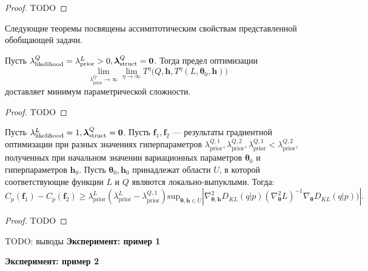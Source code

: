 \begin{proof}
TODO
\end{proof}


Следующие теоремы посвящены ассимптотическим свойствам представленной обобщающей задачи.
\begin{theorem}
Пусть ${\lambda_{\text{likelihood}}^Q}= {\lambda_{\text{prior}}^L}>0, {\boldsymbol{\lambda}^Q_{\text{struct}} }= \bf{0}$.
Тогда предел оптимизации
\[
\lim_{{\lambda^Q_\text{prior}} \to \infty} \lim_{\eta \to \infty}   T^\eta\bigl(Q, \mathbf{h}, T^\eta(L, \boldsymbol{\theta}_0, \mathbf{h})\bigr)
\]  
доставляет минимум параметрической сложности. 
\end{theorem}
\begin{proof}
TODO
\end{proof}

\begin{theorem}
Пусть ${\lambda^L_{\text{likelihood}}} = 1 ,{\boldsymbol{\lambda}^Q_{\text{struct}}} = \bf 0$.
Пусть  $\mathbf{f}_1, \mathbf{f}_2$ --- результаты градиентной оптимизации при разных значениях гиперпараметров ${\lambda_{\text{prior}}^{Q,1},\lambda_{\text{prior}}^{Q,2}, \lambda_{\text{prior}}^{Q,1}<\lambda_{\text{prior}}^{Q,2}}$, полученных при начальном значении вариационных параметров $\boldsymbol{\theta}_0$ и гиперпараметров $\mathbf{h}_0$.
Пусть $\boldsymbol{\theta}_0, \mathbf{h}_0$ принадлежат области  $U$, в которой соответствующие функции $L$ и $Q$ являются локально-выпуклыми.
Тогда:
\[
    C_p(\mathbf{f}_1)-C_p(\mathbf{f}_2)  \geq {\lambda_\text{prior}^L(\lambda_\text{prior}^L-\lambda_\text{prior}^{Q,1})}\text{sup}_{\boldsymbol{\theta}, \mathbf{h} \in U}|\nabla^2_{\boldsymbol{\theta}, \mathbf{h}} {D_{KL}(q|p)} (\nabla^2_{\boldsymbol{\theta}} L)^{-1}   \nabla_{\boldsymbol{\theta}} {D_{KL}(q|p))}|.
\]
\end{theorem}
\begin{proof}
TODO
\end{proof}
TODO: выводы
\textbf{Эксперимент: пример 1}

\textbf{Эксперимент: пример 2}



\fi



